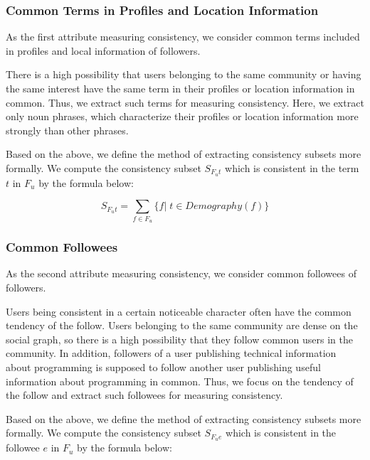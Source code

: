 \subsubsection{Common Terms in Profiles and Location Information}
\label{subsubsec:Terms}

As the first attribute measuring consistency, we consider common terms
included in profiles and local information of followers.

There is a high possibility that users belonging to the same community
or having the same interest have the same term in their profiles or
location information in common.  Thus, we extract such terms for
measuring consistency.  Here, we extract only noun phrases, which
characterize their profiles or location information more strongly than
other phrases.

Based on the above, we define the method of extracting consistency
subsets more formally.  We compute the consistency subset $S_{F_ut}$
which is consistent in the term $t$ in $F_u$ by the formula below:

\vspace{-1ex}
\[
 S_{F_ut} =  \sum_{f \in F_u} \{f|\;t \in \mathit{Demography}(f) \}
\]
\vspace{-2ex}


\subsubsection{Common Followees}
\label{subsubsec:Followees}

As the second attribute measuring consistency, we consider common
followees of followers.

Users being consistent in a certain noticeable character often have
the common tendency of the follow.  Users belonging to the same
community are dense on the social graph, so there is a high possibility
that they follow common users in the community.  In addition, followers of
a user publishing technical information about programming is supposed
to follow another user publishing useful information about programming
in common.  Thus, we focus on the tendency of the follow and extract
such followees for measuring consistency.

Based on the above, we define the method of extracting consistency
subsets more formally.  We compute the consistency subset $S_{F_ue}$
which is consistent in the followee $e$ in $F_u$ by the formula below:

